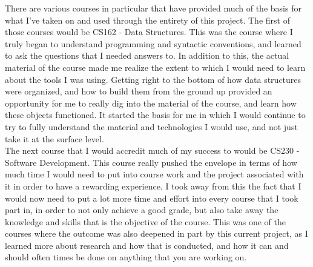 \documentclass[11pt, twocolumn]{article}
\begin{document}
There are various courses in particular that have provided much of the basis for what I've taken on and used through the entirety of this project.  The first of those courses would be CS162 - Data Structures.  This was the course where I truly began to understand programming and syntactic conventions, and learned to ask the questions that I needed answers to.  In addition to this, the actual material of the course made me realize the extent to which I would need to learn about the tools I was using.  Getting right to the bottom of how data structures were organized, and how to build them from the ground up provided an opportunity for me to really dig into the material of the course, and learn how these objects functioned.  It started the basis for me in which I would continue to try to fully understand the material and technologies I would use, and not just take it at the surface level.\\

The next course that I would accredit much of my success to would be CS230 - Software Development.  This course really pushed the envelope in terms of how much time I would need to put into course work and the project associated with it in order to have a rewarding experience.  I took away from this the fact that I would now need to put a lot more time and effort into every course that I took part in, in order to not only achieve a good grade, but also take away the knowledge and skills that is the objective of the course.  This was one of the courses where the outcome was also deepened in part by this current project, as I learned more about research and how that is conducted, and how it can and should often times be done on anything that you are working on.\\
\end{document}
